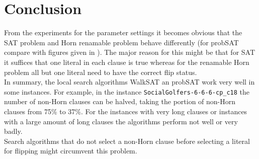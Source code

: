 \documentclass[12pt,a4paper]{article}
\begin{document}
\section{Conclusion}
From the experiments for the parameter settings it becomes  obvious that the SAT problem and Horn renamable problem behave differently (for probSAT compare with figures given in \cite{probSAT}). The major reason for this might be that for SAT it suffices that one literal in each clause is true whereas for the renamable Horn problem all but one literal need to have the correct flip status. \\

In summary, the local search algorithms WalkSAT an probSAT work very well in some instances. For example, in the instance \texttt{SocialGolfers-6-6-6-cp\_c18} the number of non-Horn clauses can be halved, taking the portion of non-Horn clauses from 75\% to 37\%. For the instances with very long clauses or instances with a large amount of long clauses the algorithms perform not well or very badly.\\
Search algorithms that do not select a non-Horn clause before selecting a literal for flipping might circumvent this problem. 
\clearpage


\end{document}
